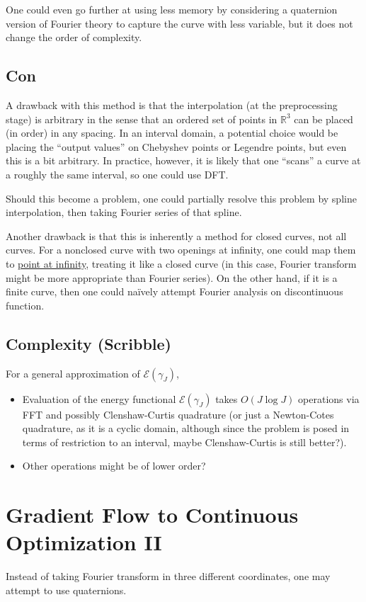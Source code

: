 \documentclass[a4paper]{article}
\theoremstyle{definition}
\begin{document}
One could even go further at using less memory by considering a quaternion version of Fourier theory to capture the curve with less variable, but it does not change the order of complexity.

\subsection{Con}
A drawback with this method is that the interpolation (at the preprocessing stage) is arbitrary in the sense that an ordered set of points in $\mathbb{R}^3$ can be placed (in order) in any spacing.
In an interval domain, a potential choice would be placing the ``output values'' on Chebyshev points or Legendre points, but even this is a bit arbitrary.
In practice, however, it is likely that one ``scans'' a curve at a roughly the same interval, so one could use DFT.

Should this become a problem, one could partially resolve this problem by spline interpolation, then taking Fourier series of that spline.

Another drawback is that this is inherently a method for closed curves, not all curves. For a nonclosed curve with two openings at infinity, one could map them to \underline{point at infinity}, treating it like a closed curve (in this case, Fourier transform might be more appropriate than Fourier series). On the other hand, if it is a finite curve, then one could na\"ively attempt Fourier analysis on discontinuous function.


\subsection{Complexity (Scribble)}
For a general approximation of $\mathcal{E}\left( \gamma_J \right)$,
\begin{itemize}
    \item Evaluation of the energy functional $\mathcal{E} \left( \gamma_J \right)$ takes $O\left( J \log J \right)$ operations via FFT and possibly Clenshaw-Curtis quadrature (or just a Newton-Cotes quadrature, as it is a cyclic domain, although since the problem is posed in terms of restriction to an interval, maybe Clenshaw-Curtis is still better?).
    \item Other operations might be of lower order? 
\end{itemize}

\section{Gradient Flow to Continuous Optimization II}
Instead of taking Fourier transform in three different coordinates, one may attempt to use quaternions.
\end{document}
